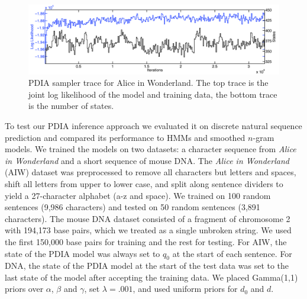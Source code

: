\begin{figure}[htbp]
\centering
\includegraphics[width=1\textwidth]{results/aiw_sampler_trace}
\caption{PDIA sampler trace for Alice in Wonderland.  The top trace is the joint log likelihood of the model and training data, the bottom trace is the number of states. \label{fig:aiw_sampler_trace}}
\end{figure}
%
To test our PDIA inference approach we evaluated it on discrete natural sequence prediction and compared its performance to HMMs and smoothed $n$-gram models.  We trained the models on two datasets: a character sequence from {\em Alice in Wonderland} \cite{Carroll1865} and a short sequence of mouse DNA.  The {\em Alice in Wonderland} (AIW) dataset was preprocessed to remove all characters but letters and spaces, shift all letters from upper to lower case, and split along sentence dividers to yield a 27-character alphabet (a-z and space).  We trained on 100 random sentences (9,986 characters) and tested on 50 random sentences (3,891 characters).   The mouse DNA dataset consisted of a fragment of chromosome 2 with 194,173 base pairs, which we treated as a single unbroken string.  We used the first 150,000 base pairs for training and the rest for testing.  For AIW, the state of the PDIA model was always set to $q_0$ at the start of each sentence.  For DNA, the state of the PDIA model at the start of the test data was set to the last state of the model after accepting the training data.  We placed Gamma(1,1) priors over $\alpha$, $\beta$ and $\gamma$, set $\lambda=.001$, and used uniform priors for $d_0$ and $d$.

